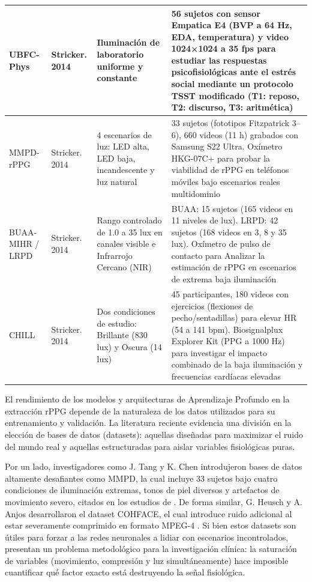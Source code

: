 \begin{longtable}{|p{2.5cm}|p{2.3cm}|p{3.2cm}|p{4.8cm}|}
        UBFC-Phys                   &  Stricker. 2014       & Iluminación de laboratorio uniforme y constante                         & 56 sujetos con sensor Empatica E4 (BVP a 64 Hz, EDA, temperatura) y video 1024×1024 a 35 fps para estudiar las respuestas psicofisiológicas ante el estrés social mediante un protocolo TSST modificado (T1: reposo, T2: discurso, T3: aritmética) \cite{sabour2023ubfcphys} \\ \hline
        MMPD-rPPG                   &  Stricker. 2014       & 4 escenarios de luz: LED alta, LED baja, incandescente y luz natural    & 33 sujetos (fototipos Fitzpatrick 3–6), 660 videos (11 h) grabados con Samsung S22 Ultra. Oxímetro HKG-07C+ para probar la viabilidad de rPPG en teléfonos móviles bajo escenarios reales multidominio  \cite{yang2022image_en, cen2025robust} \\ \hline
        BUAA-MIHR / LRPD            &  Stricker. 2014       & Rango controlado de 1.0 a 35 lux en canales visible e Infrarrojo Cercano (NIR)  &  BUAA: 15 sujetos (165 videos en 11 niveles de lux). LRPD: 42 sujetos (168 videos en 3, 8 y 35 lux). Oxímetro de pulso de contacto para Analizar la estimación de rPPG en escenarios de extrema baja iluminación \cite{cao2024stphys, wu2026udarppg} \\ \hline
        CHILL                       &  Stricker. 2014       & Dos condiciones de estudio: Brillante (830 lux) y Oscura (14 lux)       & 45 participantes, 180 videos con ejercicios (flexiones de pecho/sentadillas) para elevar HR (54 a 141 bpm). Biosignalplux Explorer Kit (PPG a 1000 Hz) para investigar el impacto combinado de la baja iluminación y frecuencias cardíacas elevadas \cite{acharya2025reliability} \\ \hline
        
\end{longtable}


El rendimiento de los modelos y arquitecturas de Aprendizaje Profundo en la extracción rPPG depende de la naturaleza de los datos utilizados para 
su entrenamiento y validación. La literatura reciente evidencia una división en la elección de bases de datos (datasets): aquellas diseñadas para maximizar 
el ruido del mundo real y aquellas estructuradas para aislar variables fisiológicas puras.

Por un lado, investigadores como J. Tang y K. Chen introdujeron bases de datos altamente desafiantes como MMPD, la cual incluye 33 sujetos bajo cuatro 
condiciones de iluminación extremas, tonos de piel diversos y artefactos de movimiento severo, citados en los estudios de \cite{chen2024image_en, zhao2024masked}. De forma similar, 
G. Heusch y A. Anjos desarrollaron el dataset COHFACE, el cual introduce ruido adicional al estar severamente comprimido en formato MPEG-4 \cite{liu2025synrppg}. 
Si bien estos datasets son útiles para forzar a las redes neuronales a lidiar con escenarios incontrolados, presentan un problema metodológico para la 
investigación clínica: la saturación de variables (movimiento, compresión y luz simultáneamente) hace imposible cuantificar qué factor exacto está destruyendo 
la señal fisiológica.

